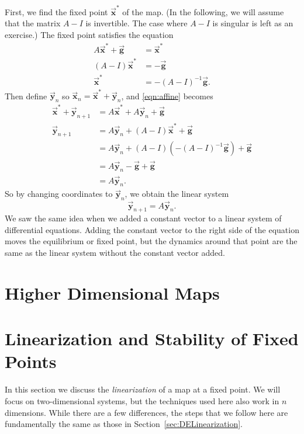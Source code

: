 \documentclass{book}
\newcommand{\BG}{\vec{\textbf{g}}}
\newcommand{\BX}{\vec{\textbf{x}}}
\newcommand{\BY}{\vec{\textbf{y}}}
\begin{document}
First, we find the fixed point $\BX^*$ of the map.
(In the following, we will assume that 
the matrix $A-I$ is invertible.  The case
where $A-I$ is singular is left as an exercise.)
The fixed point satisfies the equation
\begin{equation}
\begin{split}
   A\BX^* + \BG & = \BX^* \\
   (A-I)\BX^* & = -\BG \\
       \BX^* & = -(A-I)^{-1}\BG.
\end{split}
\end{equation}
Then define $\BY_n$ so $\BX_n = \BX^* + \BY_n$,
and \eqref{eqn:affine} becomes
\begin{equation}
\begin{split}
  \BX^* + \BY_{n+1} & = A\BX^* + A\BY_n +\BG \\
  \BY_{n+1} & = A\BY_n + (A-I)\BX^* + \BG \\
            & = A\BY_n + (A-I)\left(-(A-I)^{-1}\BG\right)+\BG \\
	    & = A\BY_n -\BG+\BG \\
	    & = A\BY_n.
\end{split}
\end{equation}
So by changing coordinates to $\BY_n$, we obtain
the linear system
\begin{equation}
  \BY_{n+1} = A\BY_n .
\end{equation}
We saw the same idea when we added a constant vector to a
linear system of differential equations.
Adding the constant vector to the right side of the equation
moves the equilibrium or fixed point, but
the dynamics around that point are the same
as the linear system without the constant vector added.


\section{Higher Dimensional Maps}
%
\section{Linearization and Stability of Fixed Points}
%
In this section we discuss the \emph{linearization}
of a map at a fixed point. 
We will focus on two-dimensional systems, but the
techniques used here also work in $n$ dimensions.
While there are a few differences, the steps that
we follow here are fundamentally the same as those
in Section~\ref{sec:DELinearization}.
\end{document}
